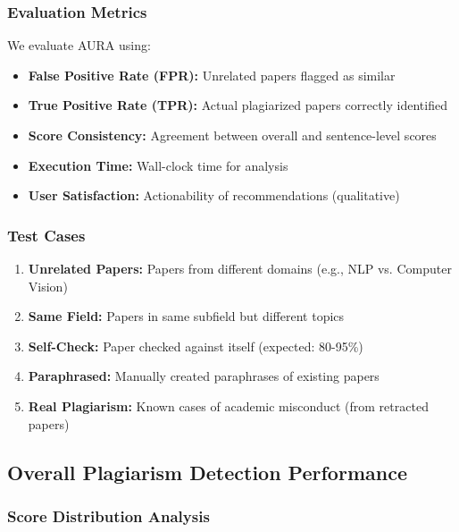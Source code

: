 \documentclass[conference]{IEEEtran}
\begin{document}
\subsubsection{Evaluation Metrics}
We evaluate AURA using:
\begin{itemize}
    \item \textbf{False Positive Rate (FPR):} Unrelated papers flagged as similar
    \item \textbf{True Positive Rate (TPR):} Actual plagiarized papers correctly identified
    \item \textbf{Score Consistency:} Agreement between overall and sentence-level scores
    \item \textbf{Execution Time:} Wall-clock time for analysis
    \item \textbf{User Satisfaction:} Actionability of recommendations (qualitative)
\end{itemize}

\subsubsection{Test Cases}
\begin{enumerate}
    \item \textbf{Unrelated Papers:} Papers from different domains (e.g., NLP vs. Computer Vision)
    \item \textbf{Same Field:} Papers in same subfield but different topics
    \item \textbf{Self-Check:} Paper checked against itself (expected: 80-95\%)
    \item \textbf{Paraphrased:} Manually created paraphrases of existing papers
    \item \textbf{Real Plagiarism:} Known cases of academic misconduct (from retracted papers)
\end{enumerate}

\subsection{Overall Plagiarism Detection Performance}

\subsubsection{Score Distribution Analysis}
\end{document}
